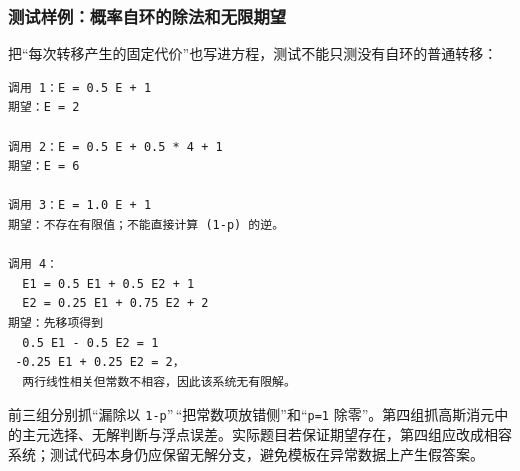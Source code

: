 \subsubsection{测试样例：概率自环的除法和无限期望}

把``每次转移产生的固定代价''也写进方程，测试不能只测没有自环的普通转移：

\begin{lstlisting}
调用 1：E = 0.5 E + 1
期望：E = 2

调用 2：E = 0.5 E + 0.5 * 4 + 1
期望：E = 6

调用 3：E = 1.0 E + 1
期望：不存在有限值；不能直接计算 (1-p) 的逆。

调用 4：
  E1 = 0.5 E1 + 0.5 E2 + 1
  E2 = 0.25 E1 + 0.75 E2 + 2
期望：先移项得到
  0.5 E1 - 0.5 E2 = 1
 -0.25 E1 + 0.25 E2 = 2，
  两行线性相关但常数不相容，因此该系统无有限解。
\end{lstlisting}

前三组分别抓``漏除以 \passthrough{\lstinline!1-p!}''\,``把常数项放错侧''和``\passthrough{\lstinline!p=1!} 除零''。第四组抓高斯消元中的主元选择、无解判断与浮点误差。实际题目若保证期望存在，第四组应改成相容系统；测试代码本身仍应保留无解分支，避免模板在异常数据上产生假答案。
